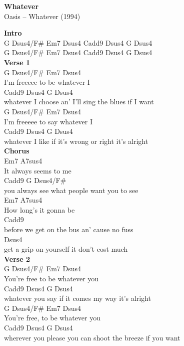 \documentclass[a4paper]{article}
\begin{document}
    \begin{center}
        \textbf{Whatever}
        ~\\
        Oasis -- Whatever (1994)
    \end{center}
    {
        \scriptsize
        \textbf{Intro}
        ~\\
        {
            \cutive
            \obeyspaces
G   Dsus4/F\#  Em7  Dsus4  Cadd9  Dsus4  G   Dsus4
\\
G   Dsus4/F\#  Em7  Dsus4  Cadd9  Dsus4  G   Dsus4
\\

        }
        \textbf{Verse 1}
        ~\\
        {
            \cutive
            \obeyspaces
    G   Dsus4/F\#        Em7    Dsus4
\\
I'm freeeee  to be whatever I
\\
    Cadd9             Dsus4                  G        Dsus4
\\
whatever I choose an' I'll sing the blues if I want
\\
    G    Dsus4/F\#       Em7     Dsus4
\\
I'm freeeee  to say whatever I
\\
    Cadd9          Dsus4                     G        Dsus4
\\
whatever I like if it's wrong or right it's alright
\\

        }
        \textbf{Chorus}
        ~\\
        {
            \cutive
            \obeyspaces
Em7                   A7sus4
\\
   It always seems to me
\\
    Cadd9                              G        Dsus4/F\#
\\
you always see what people want you to see
\\
Em7                    A7sus4
\\
   How long's it gonna be
\\
          Cadd9
\\
before we get on the bus an' cause no fuss
\\
      Dsus4
\\
get a grip on yourself it don't cost much
\\

        }
        \textbf{Verse 2}
        ~\\
        {
            \cutive
            \obeyspaces
    G   Dsus4/F\#        Em7    Dsus4
\\
You're free to be whatever you
\\
    Cadd9             Dsus4                  G        Dsus4
\\
whatever you say if it comes my way it's alright
\\
    G    Dsus4/F\#       Em7     Dsus4
\\
You're free, to be whatever you
\\
    Cadd9          Dsus4                     G        Dsus4
\\
wherever you please you can shoot the breeze if you want
\\

}}
\end{document}
